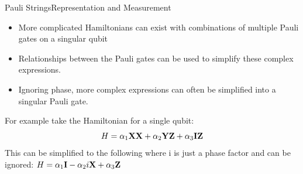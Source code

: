 \begin{frame}{Pauli Strings}{Representation and Measurement}
\begin{itemize}
    \item More complicated Hamiltonians can exist with combinations of multiple Pauli gates on a singular qubit
    \item  Relationships between the Pauli gates can be used to simplify these complex expressions.
    \item Ignoring phase, more complex expressions can often be simplified into a singular Pauli gate.
\end{itemize}

{%
\vspace{-8mm}
\begin{center}
For example take the Hamiltonian for a single qubit:
$$ H = \alpha_1 \mbox{\bfseries{\textrm{X}}} \mbox{\bfseries{\textrm{X}}} + \alpha_2 \mbox{\bfseries{\textrm{Y}}} \mbox{\bfseries{\textrm{Z}}} + \alpha_3 \mbox{\bfseries{\textrm{I}}} \mbox{\bfseries{\textrm{Z}}} $$
This can be simplified to the following where i is just a phase factor and can be ignored:
$ H = \alpha_1 \mbox{\bfseries{\textrm{I}}} - \alpha_2 i\mbox{\bfseries{\textrm{X}}} + \alpha_3\mbox{\bfseries{\textrm{Z}}} $
\end{center}
}
\end{frame}


